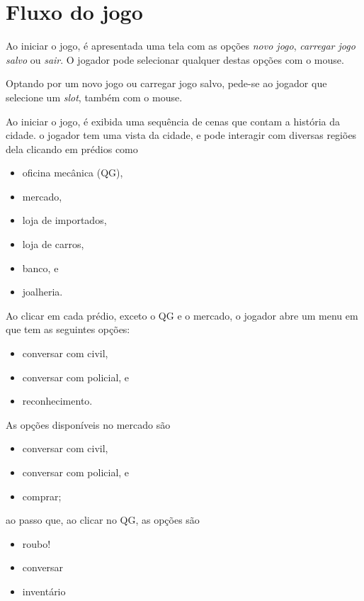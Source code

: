 \section{Fluxo do jogo}\label{fluxo-jogo}

Ao iniciar o jogo, é apresentada uma tela com as opções \emph{novo jogo}, \emph{carregar jogo salvo} ou \emph{sair}. O jogador pode selecionar qualquer destas opções com o mouse.

Optando por um novo jogo ou carregar jogo salvo, pede-se ao jogador que selecione um \emph{slot}, também com o mouse.

Ao iniciar o jogo, é exibida uma sequência de cenas que contam a história da cidade. o jogador tem uma vista da cidade, e pode interagir com diversas regiões dela clicando em prédios como
\begin{itemize}
\item oficina mecânica (QG),
\item mercado,
\item loja de importados,
\item loja de carros,
\item banco, e
\item joalheria.
\end{itemize}

Ao clicar em cada prédio, exceto o QG e o mercado, o jogador abre um menu em que tem as seguintes opções:
\begin{itemize}
\item conversar com civil,
\item conversar com policial, e
\item reconhecimento.
\end{itemize}

As opções disponíveis no mercado são
\begin{itemize}
\item conversar com civil,
\item conversar com policial, e
\item comprar;
\end{itemize}
ao passo que, ao clicar no QG, as opções são
\begin{itemize}
\item roubo!
\item conversar
\item inventário
\end{itemize}

